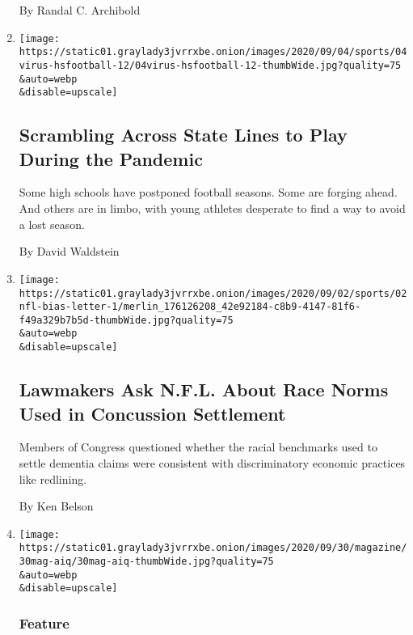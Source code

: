 \begin{enumerate}
  By Randal C. Archibold
\item
  \href{/2020/09/03/sports/ncaafootball/high-school-football-coronavirus-pandemic.html}{}

  \texttt{[image: https://static01.graylady3jvrrxbe.onion/images/2020/09/04/sports/04virus-hsfootball-12/04virus-hsfootball-12-thumbWide.jpg?quality=75\\\&auto=webp\\\&disable=upscale]}

  \hypertarget{scrambling-across-state-lines-to-play-during-the-pandemic}{%
  \subsection{Scrambling Across State Lines to Play During the
  Pandemic}\label{scrambling-across-state-lines-to-play-during-the-pandemic}}

  Some high schools have postponed football seasons. Some are forging
  ahead. And others are in limbo, with young athletes desperate to find
  a way to avoid a lost season.

  By David Waldstein
\item
  \href{/2020/09/02/sports/football/nfl-concussion-settlement-race-bias-congress.html}{}

  \texttt{[image: https://static01.graylady3jvrrxbe.onion/images/2020/09/02/sports/02nfl-bias-letter-1/merlin\_176126208\_42e92184-c8b9-4147-81f6-f49a329b7b5d-thumbWide.jpg?quality=75\\\&auto=webp\\\&disable=upscale]}

  \hypertarget{lawmakers-ask-nfl-about-race-norms-used-in-concussion-settlement}{%
  \subsection{Lawmakers Ask N.F.L. About Race Norms Used in Concussion
  Settlement}\label{lawmakers-ask-nfl-about-race-norms-used-in-concussion-settlement}}

  Members of Congress questioned whether the racial benchmarks used to
  settle dementia claims were consistent with discriminatory economic
  practices like redlining.

  By Ken Belson
\item
  \href{/2020/09/02/magazine/athletic-intelligence.html}{}

  \texttt{[image: https://static01.graylady3jvrrxbe.onion/images/2020/09/30/magazine/30mag-aiq/30mag-aiq-thumbWide.jpg?quality=75\\\&auto=webp\\\&disable=upscale]}

  \hypertarget{feature}{%
  \subsubsection{Feature}\label{feature}}


\end{enumerate}
